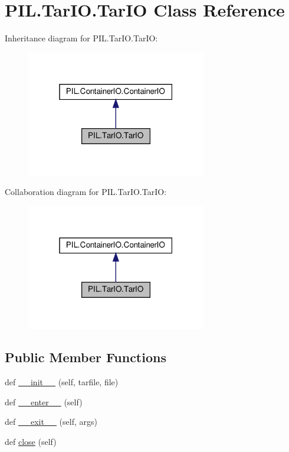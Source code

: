 \hypertarget{classPIL_1_1TarIO_1_1TarIO}{}\section{P\+I\+L.\+Tar\+I\+O.\+Tar\+IO Class Reference}
\label{classPIL_1_1TarIO_1_1TarIO}


Inheritance diagram for P\+I\+L.\+Tar\+I\+O.\+Tar\+IO\+:
\nopagebreak
\begin{figure}[H]
\begin{center}
\leavevmode
\includegraphics[width=223pt]{classPIL_1_1TarIO_1_1TarIO__inherit__graph}
\end{center}
\end{figure}


Collaboration diagram for P\+I\+L.\+Tar\+I\+O.\+Tar\+IO\+:
\nopagebreak
\begin{figure}[H]
\begin{center}
\leavevmode
\includegraphics[width=223pt]{classPIL_1_1TarIO_1_1TarIO__coll__graph}
\end{center}
\end{figure}
\subsection*{Public Member Functions}
\begin{DoxyCompactItemize}
\item 
def \hyperlink{classPIL_1_1TarIO_1_1TarIO_aa4e263ae2b2cabc91dfc3672269d5fe8}{\+\_\+\+\_\+init\+\_\+\+\_\+} (self, tarfile, file)
\item 
def \hyperlink{classPIL_1_1TarIO_1_1TarIO_a33f82c2add29a666e94d162e1c0ef034}{\+\_\+\+\_\+enter\+\_\+\+\_\+} (self)
\item 
def \hyperlink{classPIL_1_1TarIO_1_1TarIO_a1da3ed367c85c87442d541018f11f6d0}{\+\_\+\+\_\+exit\+\_\+\+\_\+} (self, args)
\item 
def \hyperlink{classPIL_1_1TarIO_1_1TarIO_a5640c11f47b37776c13654e1d4a77f0c}{close} (self)
\end{DoxyCompactItemize}
